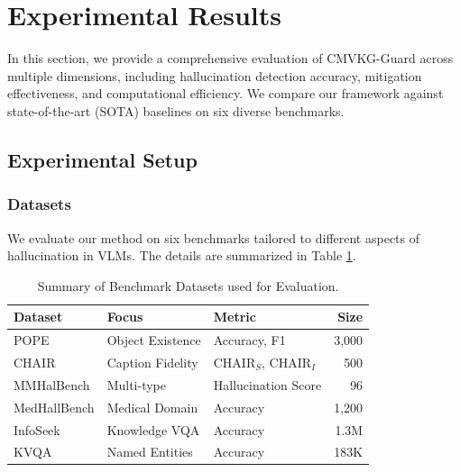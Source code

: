 \providecommand{\revised}[1]{{\color{blue}#1}}
\section{Experimental Results}
\label{sec:results}

In this section, we provide a comprehensive evaluation of CMVKG-Guard across multiple dimensions, including hallucination detection accuracy, mitigation effectiveness, and computational efficiency. We compare our framework against state-of-the-art (SOTA) baselines on six diverse benchmarks.

\subsection{Experimental Setup}

\subsubsection{Datasets}
We evaluate our method on six benchmarks tailored to different aspects of hallucination in VLMs. The details are summarized in Table \ref{tab:datasets}.

\begin{table}[htbp]
\centering
\caption{Summary of Benchmark Datasets used for Evaluation.}
\label{tab:datasets}

\begin{tabular}{l l l r}
\hline
\textbf{Dataset} & \textbf{Focus} & \textbf{Metric} & \textbf{Size} \\
\hline
POPE \cite{li2023pope} & Object Existence & Accuracy, F1 & 3,000 \\
CHAIR \cite{rohrbach2018object} & Caption Fidelity & CHAIR$_S$, CHAIR$_I$ & 500 \\
MMHalBench \cite{sun2024mmhal} & Multi-type & Hallucination Score & 96 \\
MedHallBench & Medical Domain & Accuracy & 1,200 \\
InfoSeek & Knowledge VQA & Accuracy & 1.3M \\
KVQA & Named Entities & Accuracy & 183K \\
\hline
\end{tabular}

\end{table}

